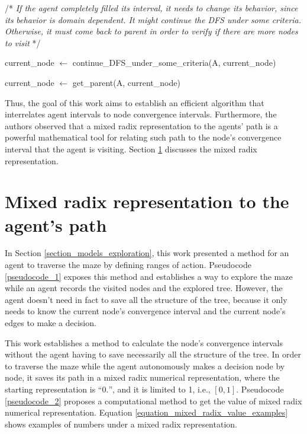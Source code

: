 \begin{algorithm}
\begin{algorithmic}
\EndIf

\State

\State /* \textit{If the agent completely filled its interval, it needs to change its behavior, since its}
\State \textit{behavior is domain dependent. It might continue the DFS under some criteria.}
\State \textit{Otherwise, it must come back to parent in order to verify if there are more nodes to}
\State \textit{visit} */


\State current\_node $\gets$ continue\_DFS\_under\_some\_criteria(A, current\_node)

\Else

\State current\_node $\gets$ get\_parent(A, current\_node)

\EndIf

\EndWhile

\end{algorithmic}
\end{algorithm}

Thus, the goal of this work aims to establish an efficient algorithm that interrelates agent intervals to node convergence intervals. Furthermore, the authors observed that a mixed radix representation to the agents' path is a powerful mathematical tool for relating such path to the node's convergence interval that the agent is visiting. Section \ref{section_models_mixed_radix} discusses the mixed radix representation.

\section{Mixed radix representation to the agent's path}
\label{section_models_mixed_radix}
In Section \ref{section_models_exploration}, this work presented a method for an agent to traverse the maze by defining ranges of action. Pseudocode \ref{pseudocode_1} exposes this method and establishes a way to explore the maze while an agent records the visited nodes and the explored tree. However, the agent doesn't need in fact to save all the structure of the tree, because it only needs to know the current node's convergence interval and the current node's edges to make a decision.

This work establishes a method to calculate the node's convergence intervals without the agent having to save necessarily all the structure of the tree. In order to traverse the maze while the agent autonomously makes a decision node by node, it saves its path in a mixed radix numerical representation, where the starting representation is ``$0.$'', and it is limited to 1, i.e., $[0,1]$. Pseudocode \ref{pseudocode_2} proposes a computational method to get the value of mixed radix numerical representation. Equation \ref{equation_mixed_radix_value_examples} shows examples of numbers under a mixed radix representation.

